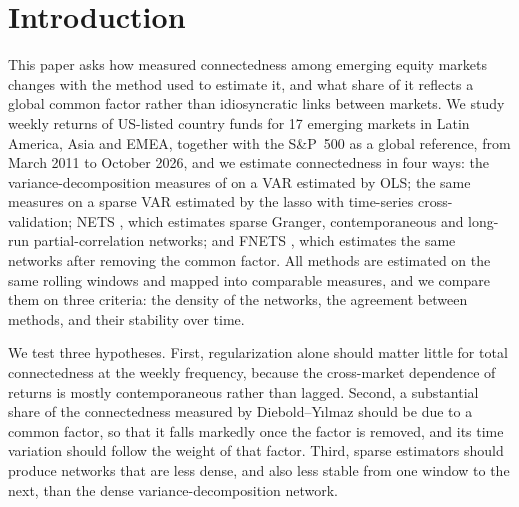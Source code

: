\section{Introduction}

This paper asks how measured connectedness among emerging equity markets changes with the method used to estimate it, and what share of it reflects a global common factor rather than idiosyncratic links between markets. We study weekly returns of US-listed country funds for 17 emerging markets in Latin America, Asia and EMEA, together with the S\&P~500 as a global reference, from March 2011 to October 2026, and we estimate connectedness in four ways: the variance-decomposition measures of \citet{diebold2014network} on a VAR estimated by OLS; the same measures on a sparse VAR estimated by the lasso with time-series cross-validation; NETS \citep{barigozzi2019nets}, which estimates sparse Granger, contemporaneous and long-run partial-correlation networks; and FNETS \citep{barigozzi2024fnets}, which estimates the same networks after removing the common factor. All methods are estimated on the same rolling windows and mapped into comparable measures, and we compare them on three criteria: the density of the networks, the agreement between methods, and their stability over time.

We test three hypotheses. First, regularization alone should matter little for total connectedness at the weekly frequency, because the cross-market dependence of returns is mostly contemporaneous rather than lagged. Second, a substantial share of the connectedness measured by Diebold--Y{\i}lmaz should be due to a common factor, so that it falls markedly once the factor is removed, and its time variation should follow the weight of that factor. Third, sparse estimators should produce networks that are less dense, and also less stable from one window to the next, than the dense variance-decomposition network.

